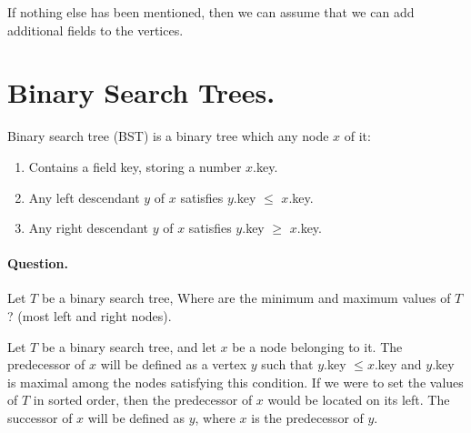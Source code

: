 If nothing else has been mentioned, then we can assume that we can add additional fields to the vertices.


\section{Binary Search Trees.} Binary search tree (BST) is a binary tree which any node $x$ of it: 
\begin{enumerate}
  \item Contains a field key, storing a number $x$.key. 
  \item Any left descendant $y$ of $x$ satisfies $y$.key $\le$ $x$.key. 
  \item Any right descendant $y$ of $x$ satisfies $y$.key $\ge$ $x$.key. 
\end{enumerate}

\paragraph{Question.} Let $T$ be a binary search tree, Where are the minimum and maximum values of $T$? (most left and right nodes). 

\begin{definition}
Let $T$ be a binary search tree, and let $x$ be a node belonging to it. The predecessor of $x$ will be defined as a vertex $y$ such that $y$.key $\leq x$.key and $y$.key is maximal among the nodes satisfying this condition. If we were to set the values of $T$ in sorted order, then the predecessor of $x$ would be located on its left. The successor of $x$ will be defined as $y$, where $x$ is the predecessor of $y$.
\end{definition}

